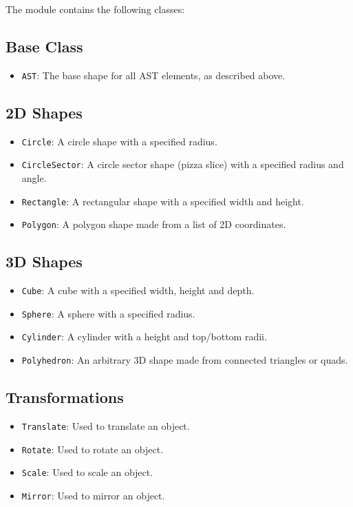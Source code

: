 \noindent The module contains the following classes:

\subsection{Base Class}

\begin{itemize}
	\item \texttt{AST}: The base shape for all AST elements, as described above.
\end{itemize}

\subsection{2D Shapes}

\begin{itemize}
	\item \texttt{Circle}: A circle shape with a specified radius.
	\item \texttt{CircleSector}: A circle sector shape (pizza slice) with a
		specified radius and angle.
	\item \texttt{Rectangle}: A rectangular shape with a specified width and
		height.
	\item \texttt{Polygon}: A polygon shape made from a list of 2D coordinates.
\end{itemize}

\subsection{3D Shapes}

\begin{itemize}
	\item \texttt{Cube}: A cube with a specified width, height and depth.
	\item \texttt{Sphere}: A sphere with a specified radius.
	\item \texttt{Cylinder}: A cylinder with a height and top/bottom radii.
	\item \texttt{Polyhedron}: An arbitrary 3D shape made from connected triangles
		or quads.
\end{itemize}

\subsection{Transformations}

\begin{itemize}
	\item \texttt{Translate}: Used to translate an object.
	\item \texttt{Rotate}: Used to rotate an object.
	\item \texttt{Scale}: Used to scale an object.
	\item \texttt{Mirror}: Used to mirror an object.
\end{itemize}

